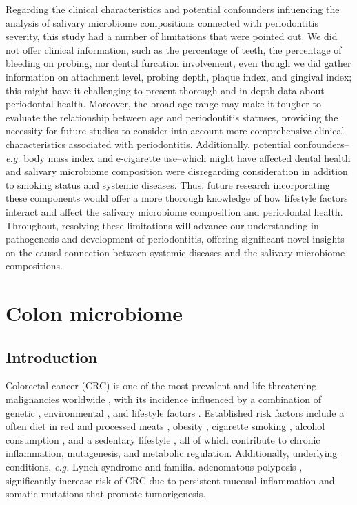 \documentclass[11pt, a4paper, onecolumn, oneside]{report}
\begin{document}
            Regarding the clinical characteristics and potential confounders influencing the analysis of salivary microbiome compositions connected with periodontitis severity, this study had a number of limitations that were pointed out. We did not offer clinical information, such as the percentage of teeth, the percentage of bleeding on probing, nor dental furcation involvement, even though we did gather information on attachment level, probing depth, plaque index, and gingival index; this might have it challenging to present thorough and in-depth data about periodontal health. Moreover, the broad age range may make it tougher to evaluate the relationship between age and periodontitis statuses, providing the necessity for future studies to consider into account more comprehensive clinical characteristics associated with periodontitis. Additionally, potential confounders--\textit{e.g.} body mass index and e-cigarette use--which might have affected dental health and salivary microbiome composition were disregarding consideration in addition to smoking status and systemic diseases. Thus, future research incorporating these components would offer a more thorough knowledge of how lifestyle factors interact and affect the salivary microbiome composition and periodontal health. Throughout, resolving these limitations will advance our understanding in pathogenesis and development of periodontitis, offering significant novel insights on the causal connection between systemic diseases and the salivary microbiome compositions.
        \newpage

    \section{Colon microbiome}
        \label{section:colon}
        \subsection{Introduction}
            Colorectal cancer (CRC) is one of the most prevalent and life-threatening malignancies worldwide \cite{CRC-1, CRC-2, CRC-3}, with its incidence influenced by a combination of genetic \cite{CRC-factor-1, CRC-factor-2}, environmental \cite{CRC-factor-3, CRC-factor-4}, and lifestyle factors \cite{CRC-factor-5, CRC-factor-6, CRC-factor-7, CRC-factor-8}. Established risk factors include a often diet in red and processed meats \cite{CRC-factor-9, CRC-factor-10}, obesity \cite{CRC-factor-11, CRC-factor-12}, cigarette smoking \cite{CRC-factor-5, CRC-factor-6}, alcohol consumption \cite{CRC-factor-7, CRC-factor-8}, and a sedentary lifestyle \cite{CRC-factor-13}, all of which contribute to chronic inflammation, mutagenesis, and metabolic regulation. Additionally, underlying conditions, \textit{e.g.} Lynch syndrome \cite{CRC-disease-3, CRC-disease-4} and familial adenomatous polyposis \cite{CRC-disease-1, CRC-disease-2}, significantly increase risk of CRC due to persistent mucosal inflammation and somatic mutations that promote tumorigenesis.
\end{document}

